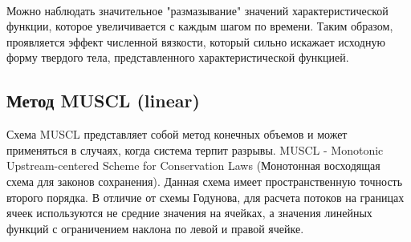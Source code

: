 \documentclass[12pt,a4paper]{article}
\begin{document}
\medskip
\\
Можно наблюдать значительное "размазывание" значений характеристической функции, которое увеличивается с каждым шагом по времени. Таким образом, проявляется эффект численной вязкости, который сильно искажает исходную форму твердого тела, представленного характеристической функцией.


\subsection{Метод MUSCL (linear)}
Схема MUSCL представляет собой метод конечных объемов и может применяться в случаях, когда система терпит разрывы. MUSCL - Monotonic Upstream-centered Scheme for Conservation Laws (Монотонная восходящая схема для законов сохранения). Данная схема имеет пространственную точность второго порядка. В отличие от схемы Годунова, для расчета потоков на границах ячеек используются не средние значения на ячейках, а значения линейных функций с ограничением наклона по левой и правой ячейке.
\end{document}
